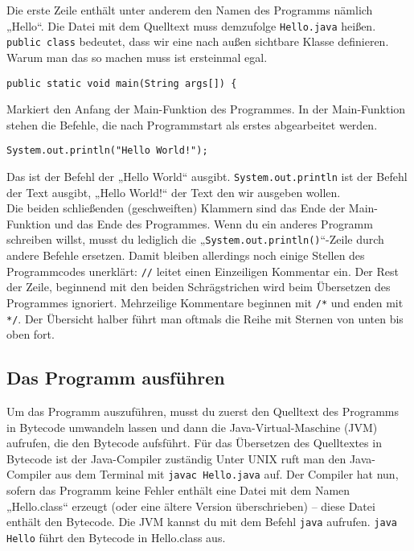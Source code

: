 Die erste Zeile enthält unter anderem den Namen des Programms nämlich „Hello“. Die Datei mit dem Quelltext muss demzufolge \lstinline$Hello.java$ heißen. \lstinline$public class$ bedeutet, dass wir eine nach außen sichtbare Klasse definieren. Warum man das so machen muss ist ersteinmal egal.\\
\begin{lstlisting}
public static void main(String args[]) {
\end{lstlisting}
Markiert den Anfang der Main-Funktion des Programmes. In der Main-Funktion stehen die Befehle, die nach Programmstart als erstes abgearbeitet werden. \\
\begin{lstlisting}
System.out.println("Hello World!");
\end{lstlisting}
Das ist der Befehl der „Hello World“ ausgibt. \lstinline$System.out.println$ ist der Befehl der Text ausgibt, „Hello World!“ der Text den wir ausgeben wollen. \\
Die beiden schließenden (geschweiften) Klammern sind das Ende der Main-Funktion und das Ende des Programmes. 
Wenn du ein anderes Programm schreiben willst, musst du lediglich die „\lstinline$System.out.println()$“-Zeile durch andere Befehle ersetzen.
Damit bleiben allerdings noch einige Stellen des Programmcodes unerklärt: \lstinline$//$ leitet einen Einzeiligen Kommentar ein. Der Rest der Zeile, beginnend mit den beiden Schrägstrichen wird beim Übersetzen des Programmes ignoriert.
Mehrzeilige Kommentare beginnen mit \lstinline$/*$ und enden mit \lstinline$*/$. Der Übersicht halber führt man oftmals die Reihe mit Sternen von unten bis oben fort.


\subsection{Das Programm ausführen}
Um das Programm auszuführen, musst du zuerst den Quelltext des Programms in Bytecode umwandeln lassen und dann die Java-Virtual-Maschine (JVM) aufrufen, die den Bytecode aufsführt. 
Für das Übersetzen des Quelltextes in Bytecode ist der Java-Compiler zuständig
Unter UNIX ruft man den Java-Compiler aus dem Terminal mit \lstinline$javac Hello.java$ auf. Der Compiler hat nun, sofern das Programm keine Fehler enthält eine Datei mit dem Namen „Hello.class“ erzeugt (oder eine ältere Version überschrieben) – diese Datei enthält den Bytecode.
Die JVM kannst du mit dem Befehl \lstinline$java$ aufrufen. \lstinline$java Hello$ führt den Bytecode in Hello.class aus.

